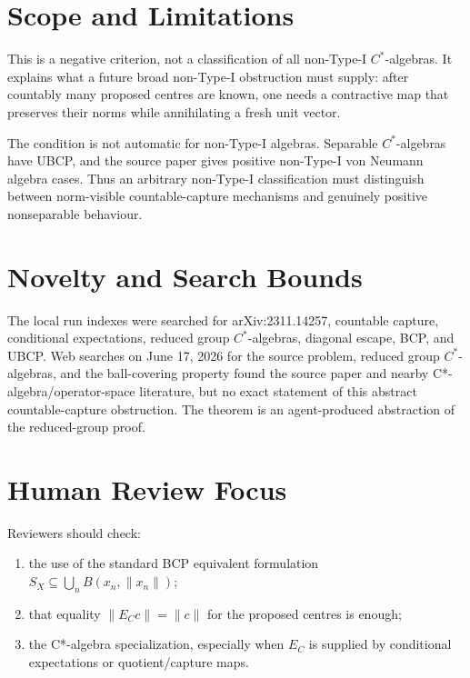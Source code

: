 \documentclass[11pt]{article}
\begin{document}
\section*{Scope and Limitations}

This is a negative criterion, not a classification of all non-Type-I
\(C^*\)-algebras.  It explains what a future broad non-Type-I obstruction
must supply: after countably many proposed centres are known, one needs a
contractive map that preserves their norms while annihilating a fresh unit
vector.

The condition is not automatic for non-Type-I algebras.  Separable
\(C^*\)-algebras have UBCP, and the source paper gives positive non-Type-I
von Neumann algebra cases.  Thus an arbitrary non-Type-I classification must
distinguish between norm-visible countable-capture mechanisms and genuinely
positive nonseparable behaviour.

\section*{Novelty and Search Bounds}

The local run indexes were searched for arXiv:2311.14257, countable capture,
conditional expectations, reduced group \(C^*\)-algebras, diagonal escape,
BCP, and UBCP.  Web searches on June 17, 2026 for the source problem,
reduced group \(C^*\)-algebras, and the ball-covering property found the
source paper and nearby C*-algebra/operator-space literature, but no exact
statement of this abstract countable-capture obstruction.  The theorem is an
agent-produced abstraction of the reduced-group proof.

\section*{Human Review Focus}

Reviewers should check:
\begin{enumerate}
    \item the use of the standard BCP equivalent formulation
          \(S_X\subseteq\bigcup_n B(x_n,\|x_n\|)\);
    \item that equality \(\|E_Cc\|=\|c\|\) for the proposed centres is enough;
    \item the C*-algebra specialization, especially when \(E_C\) is supplied
          by conditional expectations or quotient/capture maps.
\end{enumerate}
\end{document}
